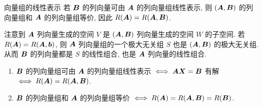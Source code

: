 \begin{frame}{向量组的线性表示}
	\onslide<+->
	若 $\bfB$ 的列向量可由 $\bfA$ 的列向量组线性表示, 则 $(\bfA,\bfB)$ 的列向量组和 $\bfA$ 的列向量组等价,
	\onslide<+->
	因此 $R(\bfA)=R(\bfA,\bfB)$.

	\onslide<+->
	注意到 $\bfA$ 列向量生成的空间 $V$ 是 $(\bfA,\bfB)$ 列向量生成的空间 $W$ 的子空间.
	\onslide<+->
	若 $R(\bfA)=R(\bfA,\bfb)$, 则 $\bfA$ 列向量组的一个极大无关组 $S$ 也是 $(\bfA,\bfB)$ 的极大无关组.
	\onslide<+->
	从而 $\bfB$ 的列向量都是 $S$ 的线性组合, 也是 $\bfA$ 列向量的线性组合.

	\onslide<+->
	\begin{theorem}
		\begin{enumerate}
			\item $\bfB$ 的列向量组可由 $\bfA$ 的列向量组线性表示 $\iff \bfA\bfX=\bfB$ 有解 $\iff R(\bfA)=R(\bfA,\bfB)$.
			\item $\bfB$ 的列向量组和 $\bfA$ 的列向量组等价 $\iff R(\bfA)=R(\bfA,\bfB)=R(\bfB)$.
		\end{enumerate}
	\end{theorem}
\end{frame}


